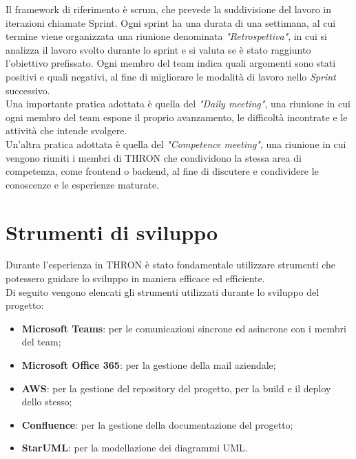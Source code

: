 Il \glsfirstoccur\gls{framework} di riferimento è \glsfirstoccur\gls{scrum}, che prevede la suddivisione del
lavoro in iterazioni chiamate \glsfirstoccur\gls{Sprint}. Ogni sprint ha una durata di una
settimana, al cui termine viene organizzata una riunione denominata
\emph{"Retrospettiva"}, in cui si analizza il lavoro svolto durante lo sprint
e si valuta se è stato raggiunto l'obiettivo prefissato. Ogni
membro del team indica quali argomenti sono stati positivi e quali
negativi, al fine di migliorare le modalità di lavoro nello
\emph{Sprint} successivo.\\
Una importante pratica adottata è quella del \emph{"Daily
      meeting"}, una riunione in cui ogni membro del team espone il proprio
avanzamento, le difficoltà incontrate e le attività che intende svolgere. \\
Un'altra pratica adottata è quella del \emph{"Competence meeting"}, una riunione
in cui vengono riuniti i membri di THRON che condividono la stessa area di
competenza, come \glsfirstoccur\gls{frontend} o \glsfirstoccur\gls{backend}, al
fine di discutere e condividere le conoscenze e le esperienze maturate. \cite{agile-manifesto}\\

\section{Strumenti di sviluppo}
Durante l'esperienza in THRON è stato fondamentale utilizzare strumenti che
potessero guidare lo sviluppo in maniera efficace ed efficiente.\\
Di seguito vengono elencati gli strumenti utilizzati durante lo sviluppo del
progetto:
\begin{itemize}
      \item \textbf{Microsoft Teams}: per le comunicazioni sincrone ed asincrone
            con i membri del team;
      \item \textbf{Microsoft Office 365}: per la gestione della mail aziendale;
      \item \textbf{\glsfirstoccur\gls{AWS}}: per la gestione del \glsfirstoccur\gls{repository} del
            progetto, per la \glsfirstoccur\gls{build} e il \glsfirstoccur\gls{deploy}
            dello stesso;
      \item \textbf{Confluence}: per la gestione della documentazione del progetto;
      \item \textbf{StarUML}: per la modellazione dei diagrammi \glsfirstoccur\gls{UML}.
\end{itemize}

